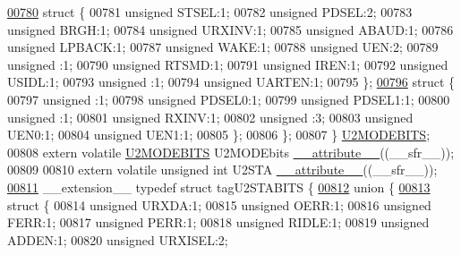 \begin{DoxyCode}
\hypertarget{a00015_source_l00780}{}\hyperlink{a00015}{00780}     \textcolor{keyword}{struct }\{
00781       \textcolor{keywordtype}{unsigned} STSEL:1;
00782       \textcolor{keywordtype}{unsigned} PDSEL:2;
00783       \textcolor{keywordtype}{unsigned} BRGH:1;
00784       \textcolor{keywordtype}{unsigned} URXINV:1;
00785       \textcolor{keywordtype}{unsigned} ABAUD:1;
00786       \textcolor{keywordtype}{unsigned} LPBACK:1;
00787       \textcolor{keywordtype}{unsigned} WAKE:1;
00788       \textcolor{keywordtype}{unsigned} UEN:2;
00789       \textcolor{keywordtype}{unsigned} :1;
00790       \textcolor{keywordtype}{unsigned} RTSMD:1;
00791       \textcolor{keywordtype}{unsigned} IREN:1;
00792       \textcolor{keywordtype}{unsigned} USIDL:1;
00793       \textcolor{keywordtype}{unsigned} :1;
00794       \textcolor{keywordtype}{unsigned} UARTEN:1;
00795     \};
\hypertarget{a00015_source_l00796}{}\hyperlink{a00015}{00796}     \textcolor{keyword}{struct }\{
00797       \textcolor{keywordtype}{unsigned} :1;
00798       \textcolor{keywordtype}{unsigned} PDSEL0:1;
00799       \textcolor{keywordtype}{unsigned} PDSEL1:1;
00800       \textcolor{keywordtype}{unsigned} :1;
00801       \textcolor{keywordtype}{unsigned} RXINV:1;
00802       \textcolor{keywordtype}{unsigned} :3;
00803       \textcolor{keywordtype}{unsigned} UEN0:1;
00804       \textcolor{keywordtype}{unsigned} UEN1:1;
00805     \};
00806   \};
00807 \} \hyperlink{a00014_d5/dac/a00841}{U2MODEBITS};
00808 \textcolor{keyword}{extern} \textcolor{keyword}{volatile} \hyperlink{a00014_d5/dac/a00841}{U2MODEBITS} U2MODEbits \hyperlink{a00015_a493c46f03454991ccc5aa7a6e1dfb2a7}{\_\_attribute\_\_}((\_\_sfr\_\_));
00809 
00810 \textcolor{keyword}{extern} \textcolor{keyword}{volatile} \textcolor{keywordtype}{unsigned} \textcolor{keywordtype}{int}  U2STA \hyperlink{a00015_a493c46f03454991ccc5aa7a6e1dfb2a7}{\_\_attribute\_\_}((\_\_sfr\_\_));
\hypertarget{a00015_source_l00811}{}\hyperlink{a00014}{00811} \_\_extension\_\_ \textcolor{keyword}{typedef} \textcolor{keyword}{struct }tagU2STABITS \{
\hypertarget{a00015_source_l00812}{}\hyperlink{a00015}{00812}   \textcolor{keyword}{union }\{
\hypertarget{a00015_source_l00813}{}\hyperlink{a00015}{00813}     \textcolor{keyword}{struct }\{
00814       \textcolor{keywordtype}{unsigned} URXDA:1;
00815       \textcolor{keywordtype}{unsigned} OERR:1;
00816       \textcolor{keywordtype}{unsigned} FERR:1;
00817       \textcolor{keywordtype}{unsigned} PERR:1;
00818       \textcolor{keywordtype}{unsigned} RIDLE:1;
00819       \textcolor{keywordtype}{unsigned} ADDEN:1;
00820       \textcolor{keywordtype}{unsigned} URXISEL:2;

\end{DoxyCode}
